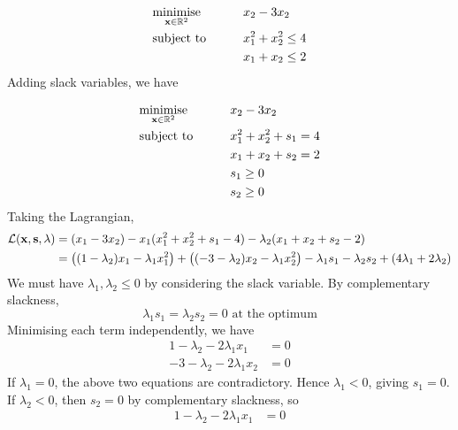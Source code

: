 \begin{example}
	\begin{alignat*}{2}
		 & \underset{\vb x \in \mathbb R^2}{\text{minimise}} & \qquad & x_2 - 3x_2           \\
		 & \text{subject to}                                 &        & x_1^2 + x_2^2 \leq 4 \\
		 &                                                   &        & x_1 + x_2 \leq 2
	\end{alignat*}
	Adding slack variables, we have

	\begin{alignat*}{2}
		 & \underset{\vb x \in \mathbb R^2}{\text{minimise}} & \qquad & x_2 - 3x_2              \\
		 & \text{subject to}                                 &        & x_1^2 + x_2^2 + s_1 = 4 \\
		 &                                                   &        & x_1 + x_2 + s_2 = 2     \\
		 &                                                   &        & s_1 \geq 0              \\
		 &                                                   &        & s_2 \geq 0
	\end{alignat*}
	Taking the Lagrangian,
	\begin{align*}
		\mathcal L(\vb x, \vb s, \vb \lambda) & = (x_1 - 3x_2) - x_1(x_1^2 + x_2^2 + s_1 - 4) - \lambda_2(x_1 + x_2 + s_2 - 2)                                                                       \\
		                                      & = \qty((1 - \lambda_2)x_1 - \lambda_1 x_1^2) + \qty((-3-\lambda_2)x_2 - \lambda_1 x_2^2) - \lambda_1 s_1 - \lambda_2 s_2 + (4\lambda_1 + 2\lambda_2)
	\end{align*}
	We must have \(\lambda_1, \lambda_2 \leq 0\) by considering the slack variable.
	By complementary slackness,
	\[
		\lambda_1 s_1 = \lambda_2 s_2 = 0 \text{ at the optimum}
	\]
	Minimising each term independently, we have
	\begin{align*}
		1 - \lambda_2 - 2\lambda_1 x_1 & = 0 \\
		-3-\lambda_2 - 2\lambda_1 x_2  & = 0
	\end{align*}
	If \(\lambda_1 = 0\), the above two equations are contradictory.
	Hence \(\lambda_1 < 0\), giving \(s_1 = 0\).
	If \(\lambda_2 < 0\), then \(s_2 = 0\) by complementary slackness, so
	\begin{align*}
		1 - \lambda_2 - 2\lambda_1 x_1 & = 0 \\

\end{align*}
\end{example}
